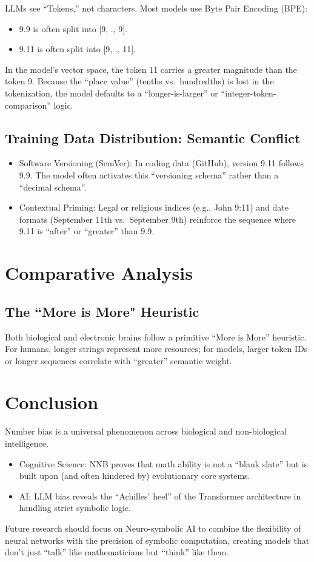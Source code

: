 LLMs see “Tokens,” not characters. Most models use Byte Pair Encoding (BPE):
\begin{itemize}
    \item 9.9 is often split into [9, ., 9].
    \item 9.11 is often split into [9, ., 11].
\end{itemize}
In the model’s vector space, the token 11 carries a greater magnitude than the token 9. Because the “place value” (tenths vs. hundredths) is lost in the tokenization, the model defaults to a “longer-is-larger” or “integer-token-comparison” logic.

\subsection{Training Data Distribution: Semantic Conflict}

\begin{itemize}
    \item Software Versioning (SemVer): In coding data (GitHub), version 9.11 follows 9.9. The model often activates this “versioning schema” rather than a “decimal schema”.
    \item Contextual Priming: Legal or religious indices (e.g., John 9:11) and date formats (September 11th vs. September 9th) reinforce the sequence where 9.11 is “after” or “greater” than 9.9.
\end{itemize}

\section{Comparative Analysis}

\subsection{The ``More is More" Heuristic}

Both biological and electronic brains follow a primitive “More is More” heuristic. For humans, longer strings represent more resources; for models, larger token IDs or longer sequences correlate with “greater” semantic weight.

\section{Conclusion}

Number bias is a universal phenomenon across biological and non-biological intelligence.
\begin{itemize}
    \item Cognitive Science: NNB proves that math ability is not a “blank slate” but is built upon (and often hindered by) evolutionary core systems.
    \item AI: LLM bias reveals the “Achilles’ heel” of the Transformer architecture in handling strict symbolic logic.
\end{itemize}
Future research should focus on Neuro-symbolic AI to combine the flexibility of neural networks with the precision of symbolic computation, creating models that don’t just “talk” like mathematicians but “think” like them.
